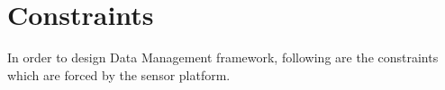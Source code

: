 \documentclass[conference]{IEEEtran}
\begin{document}
%	
\section{Constraints}\label{sec:constraints}
In order to design Data Management framework, following are the constraints which are forced by the sensor platform.
%
%
\end{document}
